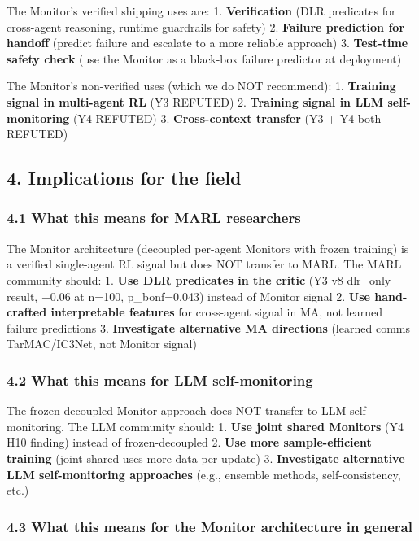 \documentclass[
]{article}
\begin{document}
The Monitor's verified shipping uses are: 1. \textbf{Verification} (DLR
predicates for cross-agent reasoning, runtime guardrails for safety) 2.
\textbf{Failure prediction for handoff} (predict failure and escalate to
a more reliable approach) 3. \textbf{Test-time safety check} (use the
Monitor as a black-box failure predictor at deployment)

The Monitor's non-verified uses (which we do NOT recommend): 1.
\textbf{Training signal in multi-agent RL} (Y3 REFUTED) 2.
\textbf{Training signal in LLM self-monitoring} (Y4 REFUTED) 3.
\textbf{Cross-context transfer} (Y3 + Y4 both REFUTED)

\subsection{4. Implications for the
field}\label{implications-for-the-field}

\subsubsection{4.1 What this means for MARL
researchers}\label{what-this-means-for-marl-researchers}

The Monitor architecture (decoupled per-agent Monitors with frozen
training) is a verified single-agent RL signal but does NOT transfer to
MARL. The MARL community should: 1. \textbf{Use DLR predicates in the
critic} (Y3 v8 dlr\_only result, +0.06 at n=100, p\_bonf=0.043) instead
of Monitor signal 2. \textbf{Use hand-crafted interpretable features}
for cross-agent signal in MA, not learned failure predictions 3.
\textbf{Investigate alternative MA directions} (learned comms
TarMAC/IC3Net, not Monitor signal)

\subsubsection{4.2 What this means for LLM
self-monitoring}\label{what-this-means-for-llm-self-monitoring}

The frozen-decoupled Monitor approach does NOT transfer to LLM
self-monitoring. The LLM community should: 1. \textbf{Use joint shared
Monitors} (Y4 H10 finding) instead of frozen-decoupled 2. \textbf{Use
more sample-efficient training} (joint shared uses more data per update)
3. \textbf{Investigate alternative LLM self-monitoring approaches}
(e.g., ensemble methods, self-consistency, etc.)

\subsubsection{4.3 What this means for the Monitor architecture in
general}\label{what-this-means-for-the-monitor-architecture-in-general}
\end{document}
